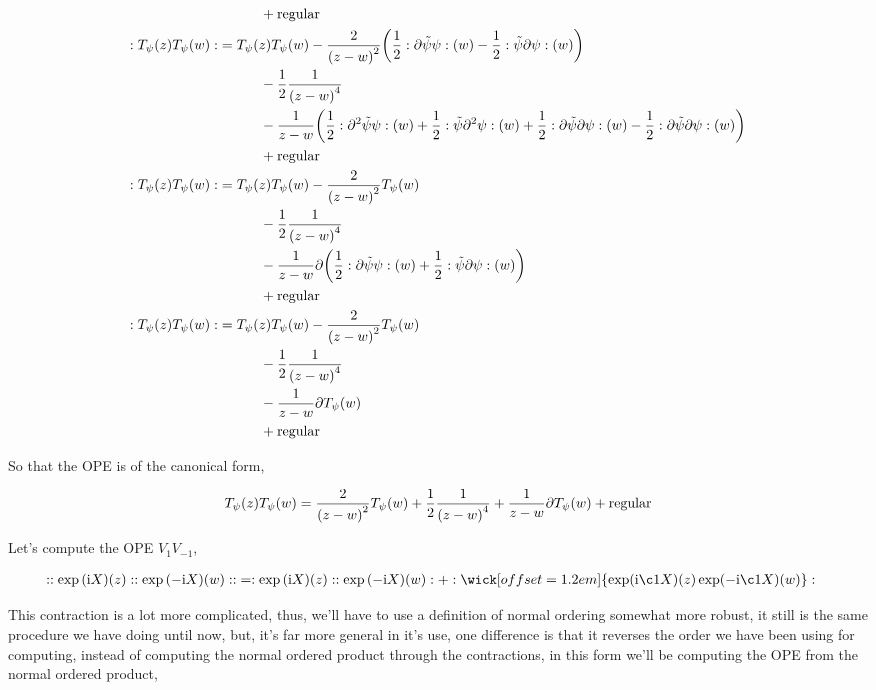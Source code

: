\begin{align*}
    &\quad\quad\quad+\textnormal{regular}\\
    :T_\psi\qty(z)T_\psi\qty(w):&=T_\psi\qty(z)T_\psi\qty(w)-\frac{2}{\qty(z-w)^2}\qty(\frac12:\partial\tilde\psi\psi:\qty(w)-\frac12:\tilde\psi\partial\psi:\qty(w))\\
    &\quad\quad\quad-\frac12\frac{1}{\qty(z-w)^4}\\
    &\quad\quad\quad-\frac{1}{z-w}\qty(\frac12:\partial^2\tilde\psi\psi:\qty(w)+\frac12:\tilde\psi\partial^2\psi:\qty(w)+\frac12:\partial\tilde\psi\partial\psi:\qty(w)-\frac12:\partial\tilde\psi\partial\psi:\qty(w))\\
    &\quad\quad\quad+\textnormal{regular}\\
    :T_\psi\qty(z)T_\psi\qty(w):&=T_\psi\qty(z)T_\psi\qty(w)-\frac{2}{\qty(z-w)^2}T_\psi\qty(w)\\
    &\quad\quad\quad-\frac12\frac{1}{\qty(z-w)^4}\\
    &\quad\quad\quad-\frac{1}{z-w}\partial\qty(\frac12:\partial\tilde\psi\psi:\qty(w)+\frac12:\tilde\psi\partial\psi:\qty(w))\\
    &\quad\quad\quad+\textnormal{regular}\\
    :T_\psi\qty(z)T_\psi\qty(w):&=T_\psi\qty(z)T_\psi\qty(w)-\frac{2}{\qty(z-w)^2}T_\psi\qty(w)\\
    &\quad\quad\quad-\frac12\frac{1}{\qty(z-w)^4}\\
    &\quad\quad\quad-\frac{1}{z-w}\partial T_\psi\qty(w)\\
    &\quad\quad\quad+\textnormal{regular}
\end{align*}

So that the OPE is of the canonical form,

\begin{align*}
    T_\psi\qty(z)T_\psi\qty(w)=\frac{2}{\qty(z-w)^2}T_\psi\qty(w)+\frac12\frac{1}{\qty(z-w)^4}+\frac{1}{z-w}\partial T_\psi\qty(w)+\textnormal{regular}
\end{align*}

\probitem{}
\label{4d}
Let's compute the OPE $V_1V_{-1}$,

\begin{align*}
    \cnord{\cnord{\exp\qty(\im X)\qty(z)}\cnord{\exp\qty(-\im X)\qty(w)}}&=\cnord{\exp\qty(\im X)\qty(z)}\cnord{\exp\qty(-\im X)\qty(w)}+\cnord{\wick[offset=1.2em]{\textnormal{exp}(\im \c1{X})\qty(z)\exp(-\im \c1{X})\qty(w)}}
\end{align*}

This contraction is a lot more complicated, thus, we'll have to use a definition of normal ordering somewhat more robust, it 
still is the same procedure we have doing until now, but, it's far more general in it's use, one difference is that it reverses 
the order we have been using for computing, instead of computing the normal ordered product through the contractions, in 
this form we'll be computing the OPE from the normal ordered product,

